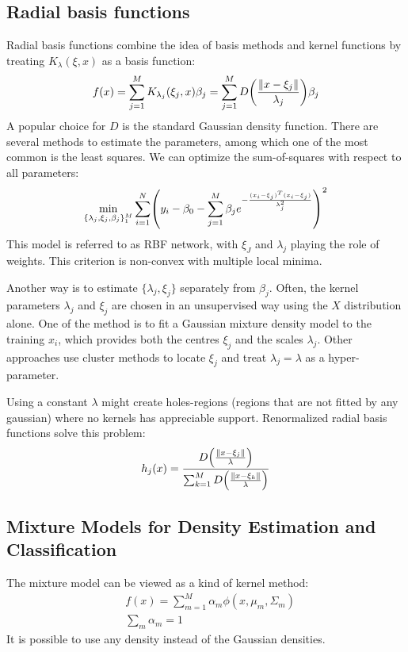 \documentclass[12pt, letterpaper]{article}
\theoremstyle{definition}
\DeclarePairedDelimiter\autobracket{(}{)}
\newcommand{\br}[1]{\autobracket*{#1}}
\begin{document}
\subsection{Radial basis functions}
Radial basis functions combine the idea of basis methods and kernel functions by treating $K_\lambda(\xi, x)$ as a basis function:
\begin{equation}
f(x) = \sum_{j=1}^M K_{\lambda_j}(\xi_j,x)\beta_j = \sum_{j=1}^M D\br{\frac{\|x-\xi_j\|}{\lambda_j}}\beta_j
\end{equation}
A popular choice for $D$ is the standard Gaussian density function. There are several methods to estimate the parameters, among which one of the most common is the least squares. We can optimize the sum-of-squares with respect to all parameters:
\begin{equation}
\min_{\{\lambda_j, \xi_j, \beta_j\}_1^M} \sum_{i=1}^N\br{y_i -\beta_0 -\sum_{j=1}^M \beta_j e^{-\frac{(x_i-\xi_j)^T(x_i-\xi_j)}{\lambda_j^2}}}^2
\end{equation}
This model is referred to as RBF network, with $\xi_J$ and $\lambda_j$ playing the role of weights. This criterion is non-convex with multiple local minima.

Another way is to estimate $\{\lambda_j,\xi_j\}$ separately from $\beta_j$. Often, the kernel parameters $\lambda_j$ and $\xi_j$ are chosen in an unsupervised way using the $X$ distribution alone. One of the method is to fit a Gaussian mixture density model  to the training $x_i$, which provides both the centres $\xi_j$ and the scales $\lambda_j$. Other approaches use cluster methods to locate $\xi_j$ and treat $\lambda_j=\lambda$ as a hyper-parameter.

Using a constant $\lambda$ might create holes-regions (regions that are not fitted by any gaussian) where no kernels has appreciable support. Renormalized radial basis functions solve this problem:
\begin{equation}
h_j(x) = \frac{D\br{\frac{\|x-\xi_j\|}{\lambda}}}{\sum_{k=1}^MD\br{\frac{\|x-\xi_k\|}{\lambda}}}
\end{equation}

\subsection{Mixture Models for Density Estimation and Classification}
The mixture model can be viewed as a kind of kernel method:
\begin{equation}
\begin{aligned}
&f(x) = \sum_{m=1}^M \alpha_m \phi(x, \mu_m,\Sigma_m)\\
&\sum_m \alpha_m =1
\end{aligned}
\label{mix}
\end{equation}
It is possible to use any density instead of the Gaussian densities.
\end{document}
